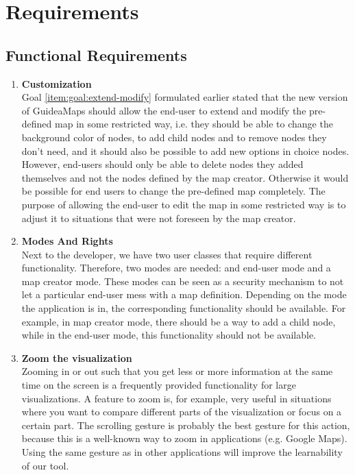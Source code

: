 \section{Requirements}\label{sec:requirements}

\subsection{Functional Requirements}\label{sec:functional-requirements}

\begin{enumerate}[label=\textbf{\arabic*}., ref=\arabic*]
	
	\item \textbf{Customization\label{item:customization}} \hfill \\
	Goal \ref{item:goal:extend-modify} formulated earlier stated that the new version of GuideaMaps should allow the end-user to extend and modify the pre-defined map in some restricted way, i.e. they should be able to change the background color of nodes, to add child nodes and to remove nodes they don't need, and it should also be possible to add new options in choice nodes. However, end-users should only be able to delete nodes they added themselves and not the nodes defined by the map creator. Otherwise it would be possible for end users to change the pre-defined map completely. The purpose of allowing the end-user to edit the map in some restricted way is to adjust it to situations that were not foreseen by the map creator.
  
	\item \textbf{Modes And Rights\label{item:modes-rights}} \hfill \\
	Next to the developer, we have two user classes that require different functionality. Therefore, two modes are needed: and end-user mode and a map creator mode. These modes can be seen as a security mechanism to not let a particular end-user mess with a map definition. Depending on the mode the application is in, the corresponding functionality should be available. For example, in map creator mode, there should be a way to add a child node, while in the end-user mode, this functionality should not be available.
  
	\item \textbf{Zoom the visualization}\label{item:zoom} \hfill \\
	Zooming in or out such that you get less or more information at the same time on the screen is a frequently provided functionality for large visualizations. A feature to zoom is, for example, very useful in situations where you want to compare different parts of the visualization or focus on a certain part. The scrolling gesture is probably the best gesture for this action, because this is a well-known way to zoom in applications (e.g. Google Maps). Using the same gesture as in other applications will improve the learnability of our tool.
	

\end{enumerate}
